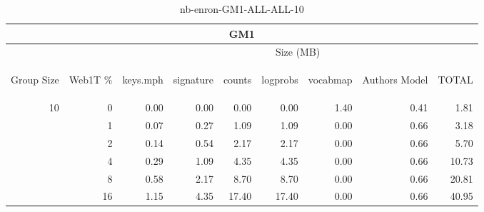 \begin{center}
\begin{table}[htbp]
\begin{tabular}{ | r | r | r | r | r | r | r | r | r |}
\hline
\multicolumn{9}{|c|}{GM1}\\
\hline
 & & \multicolumn{7}{|c|}{Size (MB)}\\ \cline{3-9}
\begin{sideways}Group Size\end{sideways} & \begin{sideways}Web1T \% \end{sideways} & \begin{sideways}keys.mph\end{sideways} & \begin{sideways}signature\end{sideways} & \begin{sideways}counts\end{sideways} & \begin{sideways}logprobs\end{sideways} & \begin{sideways}vocabmap\end{sideways} & \begin{sideways}Authors Model \end{sideways} & \begin{sideways}TOTAL\end{sideways}\\
\hline
\multirow{5}{*}{10}
 & 0 & 0.00 & 0.00 & 0.00 & 0.00 & 1.40 & 0.41 & 1.81\\ \cline{2-9}
 & 1 & 0.07 & 0.27 & 1.09 & 1.09 & 0.00 & 0.66 & 3.18\\ \cline{2-9}
 & 2 & 0.14 & 0.54 & 2.17 & 2.17 & 0.00 & 0.66 & 5.70\\ \cline{2-9}
 & 4 & 0.29 & 1.09 & 4.35 & 4.35 & 0.00 & 0.66 & 10.73\\ \cline{2-9}
 & 8 & 0.58 & 2.17 & 8.70 & 8.70 & 0.00 & 0.66 & 20.81\\ \cline{2-9}
 & 16 & 1.15 & 4.35 & 17.40 & 17.40 & 0.00 & 0.66 & 40.95\\ \cline{2-9}
\hline
\end{tabular}
\caption{nb-enron-GM1-ALL-ALL-10}
\label{table:nb-enron-GM1-ALL-ALL-10}
\end{table}
\end{center}

